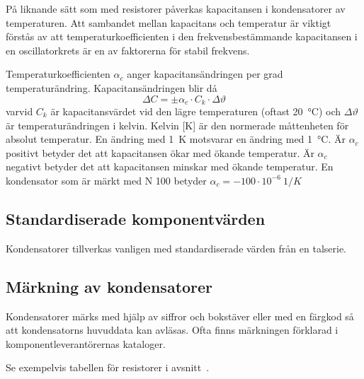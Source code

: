 På liknande sätt som med resistorer påverkas kapacitansen i kondensatorer av
temperaturen.
Att sambandet mellan kapacitans och temperatur är viktigt förstås av att
temperaturkoefficienten i den frekvensbestämmande kapacitansen i en
oscillatorkrets är en av faktorerna för stabil frekvens.

Temperaturkoefficienten \(\alpha _c\) anger
kapacitansändringen per grad temperaturändring.
Kapacitansändringen blir då
\[\Delta C = \pm \alpha _c \cdot C_k \cdot \Delta\vartheta\]
varvid \(C_k\) är kapacitansvärdet vid den lägre temperaturen (oftast
\qty{20}{\degreeCelsius}) och \(\Delta\vartheta\) är temperaturändringen i
kelvin.
Kelvin [K] är den normerade måttenheten för absolut temperatur.
En ändring med \qty{1}{\kelvin} motsvarar en ändring med \qty{1}{\degreeCelsius}.
Är \(\alpha _c\) positivt betyder det att kapacitansen ökar med ökande
temperatur.
Är \(\alpha _c\) negativt betyder det att kapacitansen minskar med ökande
temperatur.
En kondensator som är märkt med N 100 betyder
\(\alpha _c = -100 \cdot 10^{-6}\ 1/K\)

\subsection{Standardiserade komponentvärden}

Kondensatorer tillverkas vanligen med standardiserade värden från en talserie.

\subsection{Märkning av kondensatorer}

Kondensatorer märks med hjälp av siffror och bokstäver eller med en färgkod så
att kondensatorns huvuddata kan avläsas.
Ofta finns märkningen förklarad i komponentleverantörernas kataloger.

Se exempelvis tabellen för resistorer i avsnitt~.
